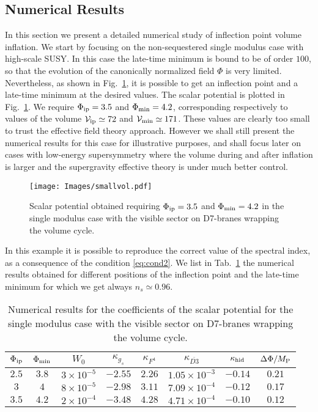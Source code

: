 \documentclass[12pt,a4paper]{book}
\newcommand\vo{{\mathcal{V}}}
\begin{document}
\subsection{Numerical Results}

In this section we present a detailed numerical study of inflection point volume inflation. We start by focusing on the non-sequestered single modulus case with high-scale SUSY. In this case the late-time minimum is bound to be of order $100$, so that the evolution of the canonically normalized field $\Phi$ is very limited. Nevertheless, as shown in Fig.~\ref{smallvol}, it is possible to get an inflection point and a late-time minimum at the desired values. The scalar potential is plotted in Fig.~\ref{smallvol}. We require $\Phi_{\rm ip} = 3.5$ and $\Phi_{\rm min} = 4.2$, corresponding respectively to values of the volume $\vo_{\rm ip} \simeq 72$ and $\vo_{\rm min} \simeq 171$. These values are clearly too small to trust the effective field theory approach. However we shall still present the numerical results for this case for illustrative purposes, and shall focus later on cases with low-energy supersymmetry where the volume during and after inflation is larger and the supergravity effective theory is under much better control.

\begin{figure}[H]
\centering
\texttt{[image: Images/smallvol.pdf]}
\caption{Scalar potential obtained requiring $\Phi_{\rm ip} = 3.5$ and $\Phi_{\rm min} = 4.2$ in the single modulus case with the visible sector on D7-branes wrapping the volume cycle.}
\label{smallvol}
\end{figure}

In this example it is possible to reproduce the correct value of the spectral index, as a consequence of the condition \eqref{eq:cond2}. We list in Tab.~\ref{tab0} the numerical results obtained for different positions of the inflection point and the late-time minimum for which we get always $n_s \simeq 0.96$.
\begin{table}[H]
\begin{center}
\begin{tabular}{cccccccc}
\hline
$\Phi_{\rm ip}$ & $\Phi_{\rm min}$ & $W_0$ & $\kappa_{g_s}$ & $\kappa_{F^4}$ & $\kappa_{\overline{D3}}$ & $\kappa_{\rm hid}$ & $\Delta \Phi/M_{\rm P}$ \\
\hline
$2.5$ & $3.8$ & $3 \times 10^{-5}$ & $-2.55$ & $2.26$ & $1.05 \times 10^{-3}$ & $-0.14$  & $0.21$\\
\hline
$3$ & $4$ & $8 \times 10^{-5}$ & $-2.98$ & $3.11$  & $7.09 \times 10^{-4}$ & $-0.12$ & $0.17$ \\
\hline
$3.5$ & $4.2$ & $2 \times 10^{-4}$ & $-3.48$ & $4.28$ & $4.71 \times 10^{-4}$ & $-0.10$ & $0.12$ \\
\hline
\end{tabular}
\end{center}
\caption{Numerical results for the coefficients of the scalar potential for the single modulus case with the visible sector on D7-branes wrapping the volume cycle.}
\label{tab0}
\end{table}
\end{document}
